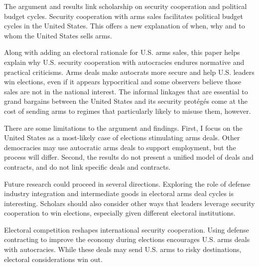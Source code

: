 \documentclass[12pt]{article}
\begin{document}
The argument and results link scholarship on security cooperation and political budget cycles. 
Security cooperation with arms sales facilitates political budget cycles in the United States. 
This offers a new explanation of when, why and to whom the United States sells arms. 


Along with adding an electoral rationale for U.S. arms sales, this paper helps explain why U.S. security cooperation with autocracies endures normative and practical criticisms. 
Arms deals make autocrats more secure and help U.S. leaders win elections, even if it appears hypocritical and some observers believe those sales are not in the national interest. 
The informal linkages that are essential to grand bargains between the United States and its security prot{\'e}g{\'e}s come at the cost of sending arms to regimes that particularly likely to misuse them, however. 


There are some limitations to the argument and findings.
First, I focus on the United States as a most-likely case of elections stimulating arms deals. 
Other democracies may use autocratic arms deals to support employment, but the process will differ. 
Second, the results do not present a unified model of deals and contracts, and do not link specific deals and contracts. 


Future research could proceed in several directions. 
Exploring the role of defense industry integration and intermediate goods in electoral arms deal cycles is interesting.
Scholars should also consider other ways that leaders leverage security cooperation to win elections, especially given different electoral institutions. 


Electoral competition reshapes international security cooperation.
Using defense contracting to improve the economy during elections encourages U.S. arms deals with autocracies.
While these deals may send U.S. arms to risky destinations, electoral considerations win out. 


 
 
\end{document}
